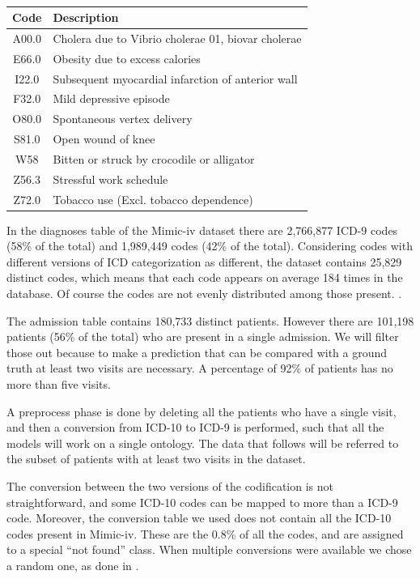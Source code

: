 \documentclass[]{marticle}
\begin{document}
\begin{table}[h]
\begin{center}
\begin{tabular}{  c  l  }
    \hline
    Code & Description \\ 
    \hline
    A00.0 & Cholera due to Vibrio cholerae 01, biovar cholerae \\ 
    E66.0 & Obesity due to excess calories \\ 
    I22.0 & Subsequent myocardial infarction of anterior wall \\ 
    F32.0 & Mild depressive episode \\ 
    O80.0 & Spontaneous vertex delivery \\ 
    S81.0 & Open wound of knee \\ 
    W58   & Bitten or struck by crocodile or alligator \\ 
    Z56.3 & Stressful work schedule \\ 
    Z72.0 & Tobacco use (Excl. tobacco dependence) \\ 
    \hline
\end{tabular}
\caption{}
\label{table:icd_examples}
\end{center}
\end{table}

In the diagnoses table of the Mimic-iv dataset there are 2,766,877 ICD-9 codes (58\% of the total)
and 1,989,449 codes (42\% of the total). Considering codes with different versions of ICD
categorization as different, the dataset contains 25,829 distinct codes, which means that each code
appears on average 184 times in the database. Of course the codes are not evenly distributed among
those present. .


The admission table contains 180,733 distinct patients. However there are 101,198 patients (56\% of
the total) who are present in a single admission. We will filter those out because to make a
prediction that can be compared with a ground truth at least two visits are necessary. A percentage
of 92\% of patients has no more than five visits.

A preprocess phase is done by deleting all the patients who have a single visit, and then a
conversion from ICD-10 to ICD-9 is performed, such that all the models will work on a single
ontology. The data that follows will be referred to the subset of patients with at least two visits
in the dataset.

The conversion between the two versions of the codification is not straightforward, and some ICD-10
codes can be mapped to more than a ICD-9 code. Moreover, the conversion table we used 
does not contain all the ICD-10 codes present in Mimic-iv. These are the 0.8\% of all the codes, and
are assigned to a special ``not found'' class. When multiple conversions were available we chose a
random one, as done in \cite{setor-paper}.
\end{document}
